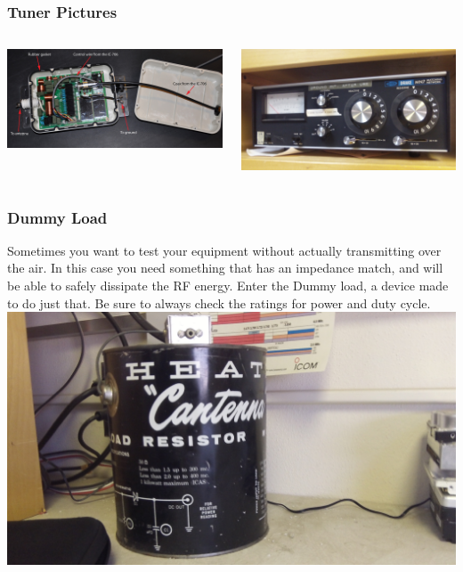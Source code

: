 \documentclass[10pt]{beamer}
\begin{document}
\begin{frame}
\frametitle{Tuner Pictures}
\begin{columns}
\begin{column}{.5\textwidth}
\includegraphics[width=\textwidth]{ah4inside.jpg}
\end{column}
\begin{column}{.5\textwidth}
\includegraphics[width=\textwidth]{drakemn7tuner.jpg}
\end{column}
\end{columns}
\end{frame}

\begin{frame}
\frametitle{Dummy Load}
Sometimes you want to test your equipment without actually transmitting over the air. In this case you need something that has an impedance match, and will be able to safely dissipate the RF energy. Enter the Dummy load, a device made to do just that. Be sure to always check the ratings for power and duty cycle.\\
\includegraphics[height=.5\textheight]{heathcantenna.jpg}
\end{frame}
\end{document}
